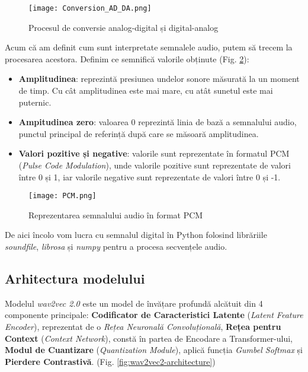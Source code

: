 \begin{figure}[h]
    \centering
    \texttt{[image: Conversion\_AD\_DA.png]}
    \caption{Procesul de conversie analog-digital și digital-analog\protect\footnotemark[1]}
    \label{fig:conversion-ad-da}
\end{figure}

\par
Acum că am definit cum sunt interpretate semnalele audio, putem să trecem la procesarea acestora.
Definim ce semnifică valorile obținute (Fig. \ref{fig:pcm}):

\begin{itemize}
    \item \textbf{Amplitudinea}: reprezintă presiunea undelor sonore măsurată la un moment de timp.
    Cu cât amplitudinea este mai mare, cu atât sunetul este mai puternic.
    \item \textbf{Ampitudinea zero}: valoarea 0 reprezintă linia de bază a semnalului audio, punctul
    principal de referință după care se măsoară amplitudinea.
    \item \textbf{Valori pozitive și negative}: valorile sunt reprezentate în formatul PCM (\textit{Pulse Code Modulation}),
    unde valorile pozitive sunt reprezentate de valori între 0 și 1, iar valorile negative sunt reprezentate
    de valori între 0 și -1.
\end{itemize}

\begin{figure}[h]
    \centering
    \texttt{[image: PCM.png]}
    \caption{Reprezentarea semnalului audio în format PCM\protect\footnotemark[1]}
    \label{fig:pcm}
\end{figure}

\par
De aici încolo vom lucra cu semnalul digital în Python folosind librăriile \textit{soundfile},
\textit{librosa} și \textit{numpy} pentru a procesa secvențele audio.
\vspace{-1em}
\subsection{Arhitectura modelului}
Modelul \textit{wav2vec 2.0} este un model de învățare profundă alcătuit din 4
componente principale: \textbf{Codificator de Caracteristici Latente} 
(\textit{Latent Feature Encoder}), reprezentat de o \textit{Rețea Neuronală Convoluțională},
\textbf{Rețea pentru Context} (\textit{Context Network}), constă în partea de Encodare
a Transformer-ului, \textbf{Modul de Cuantizare} (\textit{Quantization Module}),
aplică funcția \textit{Gumbel Softmax} și \textbf{Pierdere Contrastivă}. (Fig. \ref{fig:wav2vec2-architecture})

